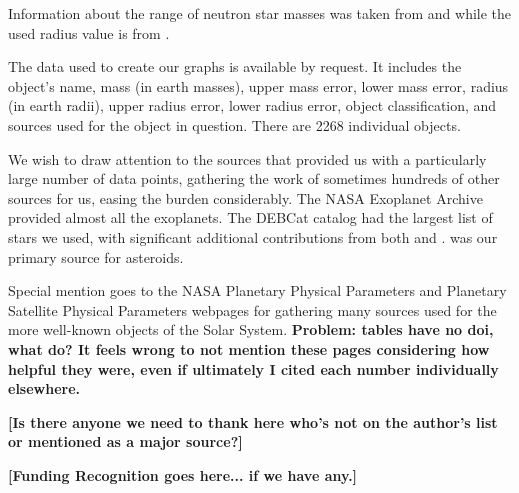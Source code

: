 \documentclass[twocolumn,linenumbers]{aastex631}
\begin{document}
Information about the range of neutron star masses was taken from \cite{Suwa2018} and \cite{Romani2022} while the used radius value is from \cite{Ozel2016}. 

\begin{acknowledgments}
The data used to create our graphs is available by request. It includes the object's name, mass (in earth masses), upper mass error, lower mass error, radius (in earth radii), upper radius error, lower radius error, object classification, and sources used for the object in question. There are 2268 individual objects. 

We wish to draw attention to the sources that provided us with a particularly large number of data points, gathering the work of sometimes hundreds of other sources for us, easing the burden considerably. The NASA Exoplanet Archive \citep{NASAExoplanetArchive} provided almost all the exoplanets. The DEBCat catalog \citep{Southworth2015} had the largest list of stars we used, with significant additional contributions from both \cite{Torres2010} and \cite{Pineda2021}. \cite{Carry2012} was our primary source for asteroids.

Special mention goes to the NASA Planetary Physical Parameters and Planetary Satellite Physical Parameters webpages for gathering many sources used for the more well-known objects of the Solar System. \textbf{\color{red}Problem: tables have no doi, what do? It feels wrong to not mention these pages considering how helpful they were, even if ultimately I cited each number individually elsewhere.\color{black}}

\textbf{\color{red}[Is there anyone we need to thank here who's not on the author's list or mentioned as a major source?]\color{black}}

\textbf{\color{red}[Funding Recognition goes here... if we have any.]\color{black}}

\end{acknowledgments}

{}

\end{document}
